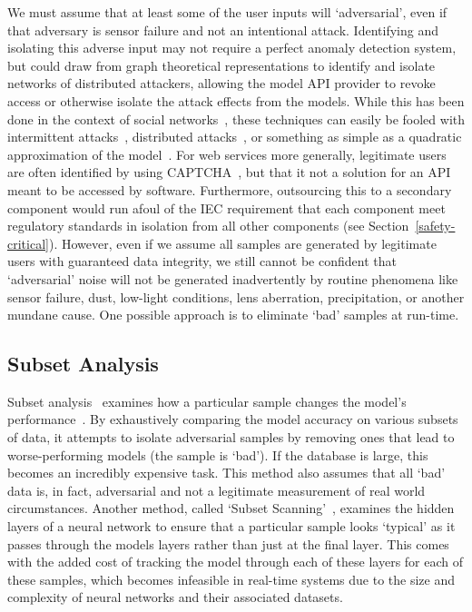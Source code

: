 We must assume that at least some of the user inputs will `adversarial', even if that adversary is sensor failure and not an intentional attack.
Identifying and isolating this adverse input may not require a perfect anomaly detection system, but could draw from graph theoretical representations to identify and isolate networks of distributed attackers, allowing the model API provider to revoke access or otherwise isolate the attack effects from the models.
While this has been done in the context of social networks~\cite{daya_graph-based_2019}, these techniques can easily be fooled with intermittent attacks~\cite{intermittent}, distributed attacks~\cite{distributed_attacks}, or something as simple as a quadratic approximation of the model~\cite{hopskipjump}.
For web services more generally, legitimate users are often identified by using CAPTCHA~\cite{ahn2003captcha}, but that it not a solution for an API meant to be accessed by software.
Furthermore, outsourcing this to a secondary component would run afoul of the IEC requirement that each component meet regulatory standards in isolation from all other components (see Section~\ref{safety-critical}).
However, even if we assume all samples are generated by legitimate users with guaranteed data integrity, we still cannot be confident that `adversarial' noise will not be generated inadvertently by routine phenomena like sensor failure, dust, low-light conditions, lens aberration, precipitation, or another mundane cause.
One possible approach is to eliminate `bad' samples at run-time.

\subsection{Subset Analysis}

Subset analysis~\cite{paudice_detection_2018} examines how a particular sample changes the model's performance~\cite{paudice_detection_2018}.
By exhaustively comparing the model accuracy on various subsets of data, it attempts to isolate adversarial samples by removing ones that lead to worse-performing models (\ie the sample is `bad').
If the database is large, this becomes an incredibly expensive task.
This method also assumes that all `bad' data is, in fact, adversarial and not a legitimate measurement of real world circumstances.
Another method, called `Subset Scanning'~\cite{cintas_detecting_2020}, examines the hidden layers of a neural network to ensure that a particular sample looks `typical' as it passes through the models layers rather than just at the final layer.
This comes with the added cost of tracking the model through each of these layers for each of these samples, which becomes infeasible in real-time systems due to the size and complexity of neural networks and their associated datasets.


